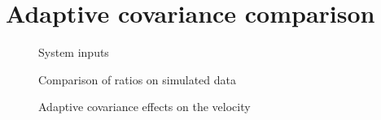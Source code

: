 \documentclass[class=article, crop=false]{standalone}
\begin{document}
\section{Adaptive covariance comparison}\label{sec:exp-covar}

\begin{figure}
    
    
    \caption{System inputs}
\end{figure}

\begin{figure}
    
    
    
    \caption{Comparison of ratios on simulated data}
\end{figure}

\begin{figure}
    
    
    
    \caption{Adaptive covariance effects on the velocity}
\end{figure}
\end{document}
